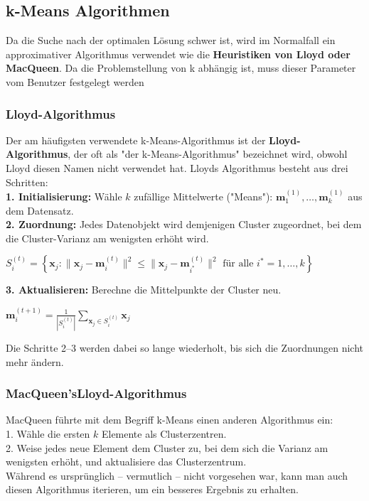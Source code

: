\documentclass[12pt]{article}
\begin{document}
\subsection{k-Means Algorithmen}

Da die Suche nach der optimalen Lösung schwer ist, wird im Normalfall ein approximativer Algorithmus verwendet wie die \textbf{ Heuristiken von Lloyd oder MacQueen}. Da die Problemstellung von k abhängig ist, muss dieser Parameter vom Benutzer festgelegt werden\\

\subsubsection{Lloyd-Algorithmus}

Der am häufigsten verwendete k-Means-Algorithmus ist der \textbf{Lloyd-Algorithmus}, der oft als "der k-Means-Algorithmus" bezeichnet wird, obwohl Lloyd diesen Namen nicht verwendet hat. Lloyds Algorithmus besteht aus drei Schritten:\\[0.2cm]
\textbf{1. Initialisierung:} Wähle $k$ zufällige Mittelwerte ("Means"): $ \mathbf m_1^{(1)}, \ldots, \mathbf m_k^{(1)} $ aus dem Datensatz.\\
\textbf{2. Zuordnung:} Jedes Datenobjekt wird demjenigen Cluster zugeordnet, bei dem die Cluster-Varianz am wenigsten erhöht wird.
\begin{center}
$ S_i^{(t)} = \left\{ \mathbf x_j : \big\| \mathbf x_j - \mathbf m^{(t)}_i \big\|^2 \leq \big\| \mathbf x_j - \mathbf m^{(t)}_{i^*} \big\|^2 \text{ für alle }i^*=1,\ldots,k \right\}$\\[0.2cm]
\end{center}
\textbf{3. Aktualisieren:} Berechne die Mittelpunkte der Cluster neu.
\begin{center}
$ \mathbf m_i^{(t+1)} = \frac{1}{|S_i^{(t)}|} \sum_{\mathbf x_j \in S_{i}^{(t)}} \mathbf x_j  $ \\
\end{center}
Die Schritte 2–3 werden dabei so lange wiederholt, bis sich die Zuordnungen nicht mehr ändern.

\subsubsection{MacQueen'sLloyd-Algorithmus} 

MacQueen führte mit dem Begriff k-Means einen anderen Algorithmus ein:
\\[0.3cm]1. Wähle die ersten $k$ Elemente als Clusterzentren.\\
2. Weise jedes neue Element dem Cluster zu, bei dem sich die Varianz am wenigsten erhöht, und aktualisiere das Clusterzentrum.
\\[0.3cm]Während es ursprünglich – vermutlich – nicht vorgesehen war, kann man auch diesen Algorithmus iterieren, um ein besseres Ergebnis zu erhalten.
\end{document}
